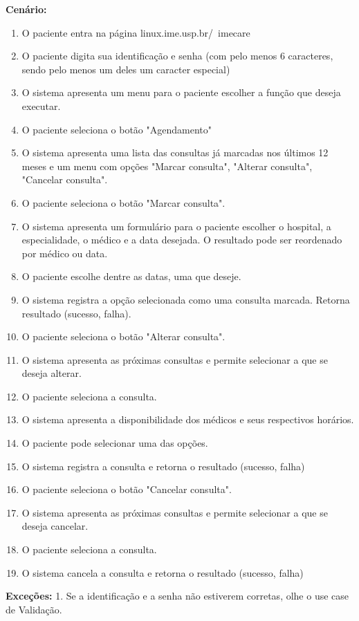 \documentclass[11pt,a4paper]{report}
\begin{document}
\textbf{Cenário:}
\begin{enumerate}

\item O paciente entra na página linux.ime.usp.br/~imecare
\item O paciente digita sua identificação e senha (com pelo menos 6 caracteres, sendo pelo menos um deles um caracter especial)
\item O sistema apresenta um menu para o paciente escolher a função que deseja executar.
\item O paciente seleciona o botão "Agendamento"
\item O sistema apresenta uma lista das consultas já marcadas nos últimos 12 meses e um menu com opções "Marcar consulta", "Alterar consulta", "Cancelar consulta".
\item O paciente seleciona o botão "Marcar consulta". 
\item O sistema apresenta um formulário para o paciente escolher o hospital, a especialidade, o médico e a data desejada. O resultado pode ser reordenado por médico ou data.
\item O paciente escolhe dentre as datas, uma que deseje. 
\item O sistema registra a opção selecionada como uma consulta marcada. Retorna resultado (sucesso, falha).
\item O paciente seleciona o botão "Alterar consulta".
\item O sistema apresenta as próximas consultas e permite selecionar a que se deseja alterar.
\item O paciente seleciona a consulta.
\item O sistema apresenta a disponibilidade dos médicos e seus respectivos horários.
\item O paciente pode selecionar uma das opções.
\item O sistema registra a consulta e retorna o resultado (sucesso, falha)
\item O paciente seleciona o botão "Cancelar consulta".
\item O sistema apresenta as próximas consultas e permite selecionar a que se deseja cancelar.
\item O paciente seleciona a consulta.
\item O sistema cancela a consulta e retorna o resultado (sucesso, falha)

\end{enumerate}

\textbf{Exceções:}
1. Se a identificação e a senha não estiverem corretas, olhe o use case de Validação.\newline
\end{document}
